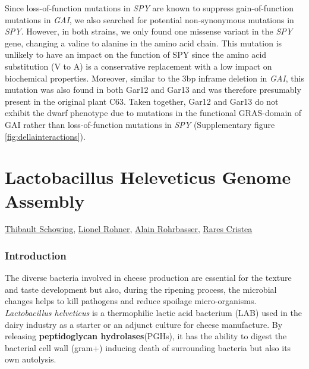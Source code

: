 \documentclass[10pt,a4paper]{article}
\begin{document}
Since loss-of-function mutations in \textit{SPY} are known to suppress gain-of-function mutations in \textit{GAI}, we also searched for potential non-synonymous mutations in \textit{SPY}. However, in both strains, we only found one missense variant in the \textit{SPY} gene, changing a valine to alanine in the amino acid chain. This mutation is unlikely to have an impact on the function of SPY since the amino acid substitution (V to A) is a conservative replacement with a low impact on biochemical properties. Moreover, similar to the 3bp inframe deletion in \textit{GAI}, this mutation was also found in both Gar12 and Gar13 and was therefore presumably present in the original plant C63. Taken together, Gar12 and Gar13 do not exhibit the dwarf phenotype due to mutations in the functional GRAS-domain of GAI rather than loss-of-function mutations in \textit{SPY}  (Supplementary figure \ref{fig:dellainteractions}).





\newpage
\part*{\Large Lactobacillus Heleveticus Genome Assembly}

\href{mailto:thibault.schowing@unifr.ch}{Thibault Schowing}, \href{mailto:lio_roh@students.unibe.ch}{Lionel Rohner},
\href{mailto:alain.rohrbasser.unifr.ch}{Alain Rohrbasser},
\href{mailto:rares.cristea@unifr.ch}{Rares Cristea}\\

\section*{\large Introduction}

The diverse bacteria involved in cheese production are essential for the texture and taste development but also, during the ripening process, the microbial changes helps to kill pathogens and reduce spoilage micro-organisms. \textit{Lactobacillus helveticus} is a thermophilic lactic acid bacterium (LAB) used in the dairy industry as a starter or an adjunct culture for cheese manufacture. By releasing \textbf{peptidoglycan hydrolases}(PGHs), it has the ability to digest the bacterial cell wall (gram+) inducing death of surrounding bacteria but also its own autolysis. \\
\end{document}
